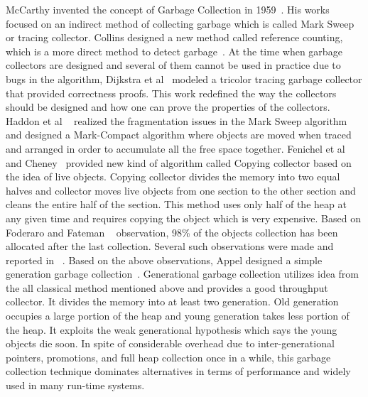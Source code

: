 McCarthy invented the concept of Garbage Collection in 1959~\cite{mccarthy}. His works focused on an indirect method of collecting 
garbage which is called Mark Sweep or tracing collector. Collins designed a new method called reference counting, which is a more direct method to detect garbage~\cite{Collins1960}. 
At the time when garbage collectors are designed and several of them cannot be used in practice due to bugs in the algorithm, Dijkstra et al~\cite{dijkstra} modeled a tricolor tracing garbage collector that provided correctness proofs. This work redefined the 
way the collectors should be designed and how one can prove the properties of the collectors. Haddon et al ~\cite{haddon} realized 
the fragmentation issues in the Mark Sweep algorithm and designed a Mark-Compact algorithm where objects are moved when traced and arranged in order to accumulate all the free space together. Fenichel et al~\cite{feni} and Cheney~\cite{cheney}
provided new kind of algorithm called Copying collector based on the idea of live objects. Copying collector divides the memory into two equal halves and collector moves live objects from one section to the other section and cleans the entire half of the section. This method uses only half of the heap at any given time and requires copying the object which is very expensive. Based on Foderaro and Fateman ~\cite{fode81} observation,  98\% of the objects collection has been allocated after the last collection. Several such observations were made and reported in ~\cite{zorn89,sans93}. Based on the above observations, Appel  designed a simple generation garbage collection~\cite{Appel89}. Generational garbage collection utilizes idea from the all classical method mentioned above and provides a good throughput collector. It divides the memory into at least two generation. Old generation occupies a large portion of the heap and young generation takes less portion of the heap. It exploits the weak generational hypothesis which says the young objects die soon. In spite of considerable overhead due to inter-generational pointers, promotions, and full heap collection once in a while, this garbage collection technique dominates alternatives in terms of performance and widely used in many run-time systems.

